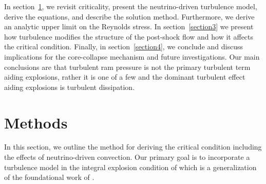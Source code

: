 \documentclass[twocolumn]{aastex6}
\begin{document}
In section~\ref{section2}, we revisit criticality, present the neutrino-driven
turbulence model, derive the equations, and describe the solution
method. Furthermore, we derive an analytic upper limit on the Reynolds
stress. In section~\ref{section3} we present how turbulence modifies the
structure of the post-shock flow and how it affects the critical
condition. Finally, in section~\ref{section4}, we conclude and discuss
implications for the core-collapse mechanism and future
investigations. Our main conclusions are that turbulent ram
  pressure is not the primary turbulent term aiding explosions, rather it is one of a few and the dominant
  turbulent effect aiding explosions is turbulent dissipation. 

\section{Methods}
\label{section2}



In this section, we outline the method for
  deriving the critical condition including the effects of
  neutrino-driven convection. Our primary goal is to incorporate a
  turbulence model in the integral explosion condition of \citet{murphy17} which is a generalization of
the foundational work of \citet{burrows93}. 
\end{document}

